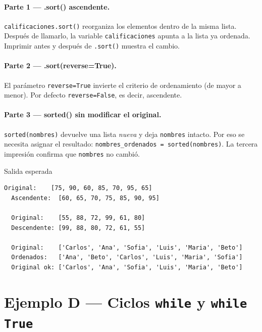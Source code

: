 \documentclass[12pt,a4paper]{article}
\begin{document}
\vspace{0.8em}
\paragraph{Parte 1 — .sort() ascendente.}
\texttt{calificaciones.sort()} reorganiza los elementos dentro de la misma
lista.  Después de llamarlo, la variable \texttt{calificaciones} apunta
a la lista ya ordenada.  Imprimir antes y después de \texttt{.sort()} muestra
el cambio.

\paragraph{Parte 2 — .sort(reverse=True).}
El parámetro \texttt{reverse=True} invierte el criterio de ordenamiento
(de mayor a menor).  Por defecto \texttt{reverse=False}, es decir,
ascendente.

\paragraph{Parte 3 — sorted() sin modificar el original.}
\texttt{sorted(nombres)} devuelve una lista \emph{nueva} y deja
\texttt{nombres} intacto.  Por eso se necesita asignar el resultado:
\texttt{nombres\_ordenados = sorted(nombres)}.
La tercera impresión confirma que \texttt{nombres} no cambió.

\vspace{0.6em}
\begin{salidabox}{Salida esperada}
\begin{lstlisting}[style=OutputStyle]
  Original:    [75, 90, 60, 85, 70, 95, 65]
  Ascendente:  [60, 65, 70, 75, 85, 90, 95]

  Original:    [55, 88, 72, 99, 61, 80]
  Descendente: [99, 88, 80, 72, 61, 55]

  Original:    ['Carlos', 'Ana', 'Sofia', 'Luis', 'Maria', 'Beto']
  Ordenados:   ['Ana', 'Beto', 'Carlos', 'Luis', 'Maria', 'Sofia']
  Original ok: ['Carlos', 'Ana', 'Sofia', 'Luis', 'Maria', 'Beto']
\end{lstlisting}
\end{salidabox}

\newpage
\section{Ejemplo D — Ciclos \texttt{while} y \texttt{while True}}
\label{sec:ejemploD}
\end{document}
